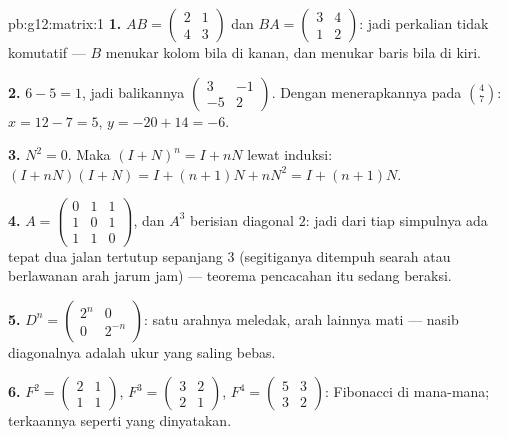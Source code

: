 \begin{solution}{pb:g12:matrix:1}
\textbf{1.} $AB = \begin{pmatrix} 2 & 1\\ 4 & 3\end{pmatrix}$
dan $BA = \begin{pmatrix} 3 & 4\\ 1 & 2\end{pmatrix}$: jadi perkalian
 tidak komutatif --- $B$ menukar kolom bila di
kanan, dan menukar baris bila di kiri.

\textbf{2.}  $6 - 5 = 1$, jadi balikannya
$\begin{pmatrix} 3 & -1\\ -5 & 2\end{pmatrix}$. Dengan menerapkannya pada
$\binom{4}{7}$: $x = 12 - 7 = 5$, $y = -20 + 14 = -6$.

\textbf{3.} $N^2 = 0$. Maka $(I + N)^n = I + nN$ lewat induksi:
$(I + nN)(I + N) = I + (n+1)N + nN^2 = I + (n+1)N$.

\textbf{4.} $A = \begin{pmatrix} 0&1&1\\ 1&0&1\\ 1&1&0
\end{pmatrix}$, dan $A^3$ berisian diagonal $2$: jadi dari tiap
simpulnya ada tepat dua jalan tertutup sepanjang $3$ (segitiganya
ditempuh searah atau berlawanan arah jarum jam) --- teorema pencacahan
itu sedang beraksi.

\textbf{5.} $D^n = \begin{pmatrix} 2^n & 0\\ 0 & 2^{-n}
\end{pmatrix}$: satu arahnya meledak, arah lainnya mati ---
nasib diagonalnya adalah  ukur yang saling bebas.

\textbf{6.} $F^2 = \begin{pmatrix} 2 & 1\\ 1 & 1\end{pmatrix}$,
$F^3 = \begin{pmatrix} 3 & 2\\ 2 & 1\end{pmatrix}$,
$F^4 = \begin{pmatrix} 5 & 3\\ 3 & 2\end{pmatrix}$: Fibonacci
di mana-mana; terkaannya seperti yang dinyatakan.


\end{solution}
